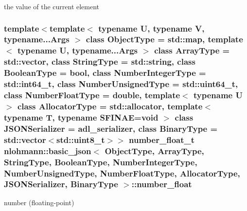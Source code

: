 the value of the current element 

\subsubsection[{\texorpdfstring{number\+\_\+float}{number_float}}]{\setlength{\rightskip}{0pt plus 5cm}template$<$template$<$ typename U, typename V, typename...\+Args $>$ class Object\+Type = std\+::map, template$<$ typename U, typename...\+Args $>$ class Array\+Type = std\+::vector, class String\+Type  = std\+::string, class Boolean\+Type  = bool, class Number\+Integer\+Type  = std\+::int64\+\_\+t, class Number\+Unsigned\+Type  = std\+::uint64\+\_\+t, class Number\+Float\+Type  = double, template$<$ typename U $>$ class Allocator\+Type = std\+::allocator, template$<$ typename T, typename S\+F\+I\+N\+A\+E=void $>$ class J\+S\+O\+N\+Serializer = adl\+\_\+serializer, class Binary\+Type  = std\+::vector$<$std\+::uint8\+\_\+t$>$$>$ {\bf number\+\_\+float\+\_\+t} {\bf nlohmann\+::basic\+\_\+json}$<$ Object\+Type, Array\+Type, String\+Type, Boolean\+Type, Number\+Integer\+Type, Number\+Unsigned\+Type, Number\+Float\+Type, Allocator\+Type, J\+S\+O\+N\+Serializer, Binary\+Type $>$\+::number\+\_\+float\hspace{0.3cm}{\ttfamily [private]}}\hypertarget{classnlohmann_1_1basic__json_abe229fa4c3b1f3536c7a85ab9cbff2e7}{}\label{classnlohmann_1_1basic__json_abe229fa4c3b1f3536c7a85ab9cbff2e7}


number (floating-\/point) 

